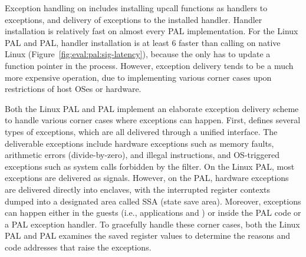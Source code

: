



Exception handling on \thehostabi{}
includes installing upcall functions as handlers to exceptions,
and delivery of exceptions to the installed handler.
Handler installation
is relatively fast on almost every PAL implementation.
For the Linux PAL and \sgx{} PAL,
handler installation
is at least 6\x{} faster than calling  on native Linux (Figure~\ref{fig:eval:pal:sig-latency}),
because the \hostapi{} only has to update a function pointer in the process.
However, exception delivery
tends to be a much more expensive operation,
due to implementing various corner cases
upon restrictions
of host OSes or hardware.




Both the Linux PAL and \sgx{} PAL implement
an elaborate exception delivery scheme
to handle various corner cases where exceptions can happen.
First, \thehostabi{}
defines several types of exceptions,
which are all delivered through a unified interface.
The deliverable exceptions
include hardware exceptions such as memory faults,
arithmetic errors (divide-by-zero), and illegal instructions,
and OS-triggered exceptions
such as system calls forbidden by the \seccomp{} filter.
On the Linux PAL,
most exceptions are delivered as signals.
However, on the \sgx{} PAL,
hardware exceptions are delivered directly into enclaves,
with the interrupted register contexts dumped
into a designated area called SSA (state save area).
Moreover, exceptions can happen
either in the guests (i.e., applications and \liboses{})
or inside the PAL code or a PAL exception handler.
To gracefully handle these corner cases,
both the Linux PAL and \sgx{} PAL examines the saved register values to determine the reasons and code addresses
that raise the exceptions.



